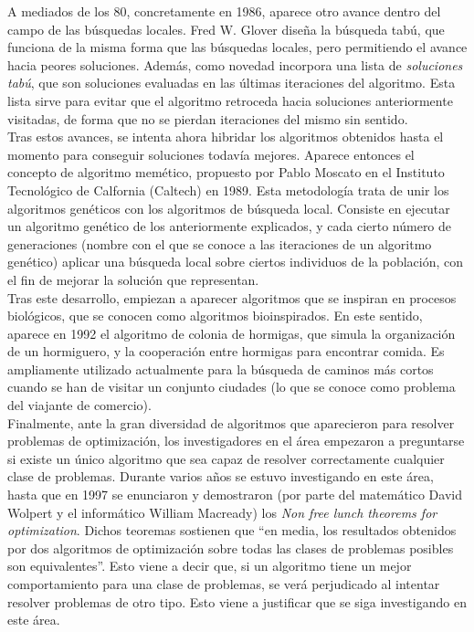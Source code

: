 \documentclass[12pt]{article} \usepackage[utf8]{inputenc}
\begin{document}
A mediados de los 80, concretamente en 1986, aparece otro avance
dentro del campo de las búsquedas locales. Fred W. Glover diseña la
búsqueda tabú, que funciona de la misma forma que las búsquedas
locales, pero permitiendo el avance hacia peores soluciones. Además,
como novedad incorpora una lista de \textit{soluciones tabú}, que son
soluciones evaluadas en las últimas iteraciones del algoritmo. Esta
lista sirve para evitar que el algoritmo retroceda hacia soluciones
anteriormente visitadas, de forma que no se pierdan iteraciones
del mismo sin sentido.\\

Tras estos avances, se intenta ahora hibridar los algoritmos obtenidos
hasta el momento para conseguir soluciones todavía mejores. Aparece
entonces el concepto de algoritmo memético, propuesto por Pablo
Moscato en el Instituto Tecnológico de Calfornia (Caltech) en
1989. Esta metodología trata de unir los algoritmos genéticos con los
algoritmos de búsqueda local. Consiste en ejecutar un algoritmo
genético de los anteriormente explicados, y cada cierto número de
generaciones (nombre con el que se conoce a las iteraciones de un
algoritmo genético) aplicar una búsqueda local sobre ciertos
individuos de la población, con el fin
de mejorar la solución que representan.\\

Tras este desarrollo, empiezan a aparecer algoritmos que se inspiran
en procesos biológicos, que se conocen como algoritmos bioinspirados.
En este sentido, aparece en 1992 el algoritmo de colonia de hormigas,
que simula la organización de un hormiguero, y la cooperación entre
hormigas para encontrar comida. Es ampliamente utilizado actualmente
para la búsqueda de caminos más cortos cuando se han de visitar un
conjunto ciudades (lo que se conoce como problema del viajante de
comercio).\\

Finalmente, ante la gran diversidad de algoritmos que aparecieron para
resolver problemas de optimización, los investigadores en el área
empezaron a preguntarse si existe un único algoritmo que sea capaz de
resolver correctamente cualquier clase de problemas. Durante varios
años se estuvo investigando en este área, hasta que en 1997 se
enunciaron y demostraron (por parte del matemático David Wolpert y el
informático William Macready) los \textit{Non free lunch theorems for
  optimization}. Dichos teoremas sostienen que ``en media, los
resultados obtenidos por dos algoritmos de optimización sobre todas
las clases de problemas posibles son equivalentes''. Esto viene a
decir que, si un algoritmo tiene un mejor comportamiento para una
clase de problemas, se verá perjudicado al intentar resolver problemas
de otro tipo. Esto viene a justificar que se siga investigando en este
área.
\end{document}
